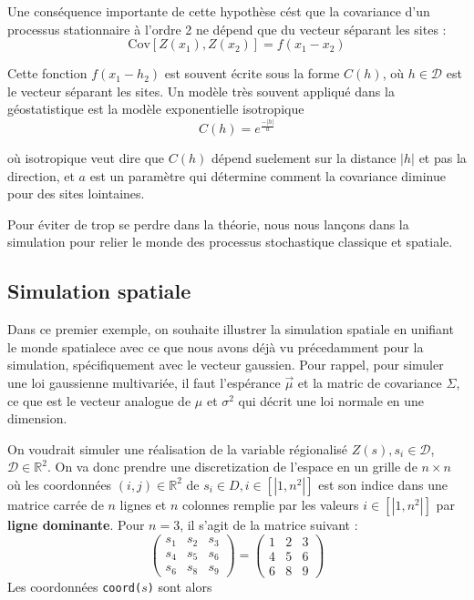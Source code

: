 \documentclass[10pt]{article} %
\begin{document}
Une conséquence importante de cette hypothèse cést que la covariance d'un processus stationnaire à l'ordre 2 ne dépend que du vecteur séparant les sites :
    $$ \mathrm{Cov}[Z(x_1), Z(x_2)] = f(x_1 - x_2) $$

Cette fonction $f(x_1 - h_2)$ est souvent écrite sous la forme $C(h)$, où $h \in \mathcal{D}$ est le vecteur séparant les sites. Un modèle très souvent appliqué dans la géostatistique est la modèle exponentielle isotropique
$$ C(h) = e^{\frac{-|h|}{a}} $$

où isotropique veut dire que $C(h)$ dépend suelement sur la distance $|h|$ et pas la direction, et $a$ est un paramètre qui détermine comment la covariance diminue pour des sites lointaines.

Pour éviter de trop se perdre dans la théorie, nous nous lan\c cons dans la simulation pour relier le monde des processus stochastique classique et spatiale.

\subsection{Simulation spatiale}

Dans ce premier exemple, on souhaite illustrer la simulation spatiale en unifiant le monde spatialece avec ce que nous avons déjà vu précedamment pour la simulation,
spécifiquement avec le vecteur gaussien. Pour rappel, pour simuler une loi gaussienne multivariée, il faut l'espérance $\vec\mu$ et la matric de covariance $\Sigma$,
ce que est le vecteur analogue de $\mu$ et $\sigma^2$ qui décrit une loi normale en une dimension.

On voudrait simuler une réalisation de la variable régionalisé $Z(s), s_i \in \mathcal{D}$, $\mathcal{D} \in \mathbb{R}^2$.
On va donc prendre une discretization de l'espace en un grille de $n \times n$ où les coordonnées
$(i, j) \in \mathbb{R}^2$ de $s_i \in D, i \in [|1, n^2|]$ est son indice dans une matrice carrée de $n$ lignes et $n$
colonnes remplie par les valeurs $i \in [|1, n^2|]$ par \textbf{ligne dominante}. Pour $n = 3$, il s'agit de la matrice suivant :
$$
    \begin{pmatrix}
        s_1 & s_2 & s_3 \\
        s_4 & s_5 & s_6 \\
        s_6 & s_8 & s_9
    \end{pmatrix}
    =
    \begin{pmatrix}
        1 & 2 & 3 \\
        4 & 5 & 6 \\
        6 & 8 & 9
    \end{pmatrix}
$$
Les coordonnées \texttt{coord($s$)} sont alors
\end{document}
